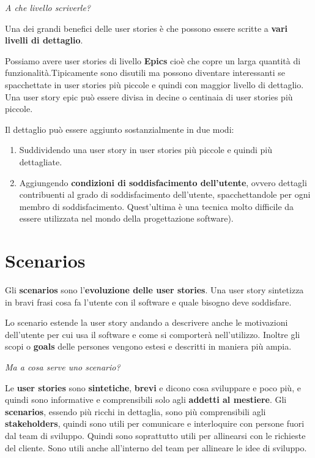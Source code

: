 \documentclass[a4paper,11pt,oneside]{book}
\begin{document}
\pagebreak

\begin{flushleft}
	\textit{A che livello scriverle?}
\end{flushleft}

Una dei grandi benefici delle user stories è che possono essere
scritte a \textbf{vari livelli di dettaglio}.

Possiamo avere user stories di livello \textbf{Epics} cioè che
copre un larga quantità di funzionalità.Tipicamente sono disutili ma possono diventare interessanti se spacchettate in user stories più piccole e quindi con maggior livello di dettaglio. Una user story epic può essere divisa in decine o centinaia di user stories più piccole.

Il dettaglio può essere aggiunto sostanzialmente in due modi:
\begin{enumerate}
	\item Suddividendo una user story in user stories più piccole e quindi più dettagliate.
	\item Aggiungendo \textbf{condizioni di soddisfacimento dell'utente}, ovvero  dettagli contribuenti al grado di soddisfacimento dell'utente, spacchettandole per ogni membro di soddisfacimento. Quest'ultima è una tecnica molto difficile da essere utilizzata nel mondo della progettazione software).
\end{enumerate}

\section{Scenarios}

Gli \textbf{scenarios} sono l'\textbf{evoluzione delle user stories}. Una user story sintetizza in bravi frasi cosa fa l'utente con il software e quale bisogno deve soddisfare.

Lo scenario estende la user story andando a descrivere anche le motivazioni dell'utente per cui usa il software e come si comporterà nell'utilizzo. Inoltre gli scopi o \textbf{goals} delle persones vengono estesi e descritti in maniera più ampia.

\begin{flushleft}
	\textit{Ma a cosa serve uno scenario?}
\end{flushleft}

Le \textbf{user stories} sono \textbf{sintetiche}, \textbf{brevi} e dicono cosa sviluppare e poco più, e quindi sono informative e comprensibili solo agli \textbf{addetti al mestiere}. Gli \textbf{scenarios}, essendo più ricchi in dettaglia, sono più comprensibili
agli \textbf{stakeholders}, quindi sono utili per comunicare e interloquire con persone fuori dal team di sviluppo. Quindi sono soprattutto utili per allinearsi con le richieste del cliente. Sono utili anche all'interno del team per allineare le idee di sviluppo.
\end{document}
